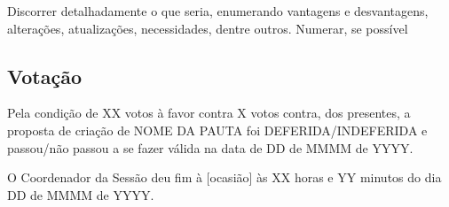 \documentclass[12pt]{article}
\begin{document}
Discorrer detalhadamente o que seria, enumerando vantagens e desvantagens, alterações, atualizações, necessidades, dentre outros. 
Numerar, se possível

\subsection*{Votação}

Pela condição de XX votos à favor contra X votos contra, dos presentes, a proposta de criação de NOME DA PAUTA foi DEFERIDA/INDEFERIDA e passou/não passou a se fazer válida na data de DD de MMMM de YYYY.

O Coordenador da Sessão deu fim à [ocasião] às XX horas e YY minutos do dia DD de MMMM de YYYY.


\end{document}
